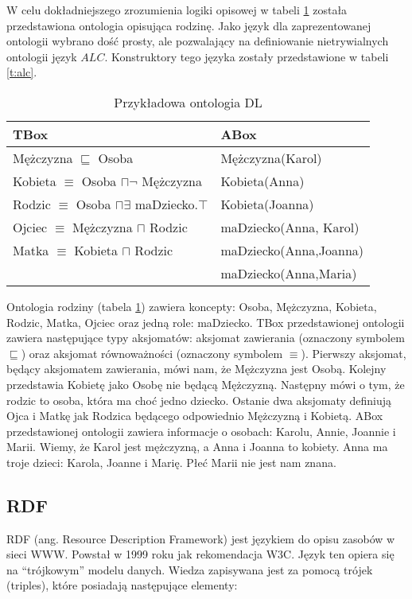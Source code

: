 W celu dokładniejszego zrozumienia logiki opisowej w tabeli \ref{t:ontology}  została przedstawiona ontologia opisująca rodzinę. Jako język dla zaprezentowanej ontologii wybrano 
dość prosty, ale pozwalający na definiowanie nietrywialnych ontologii język   $ ALC $. Konstruktory tego języka zostały przedstawione w tabeli \ref{t:alc}.

\begin{longtable}{|m{7cm}|m{5cm}|} 
\caption{Przykładowa ontologia DL \cite{goczyla2}}
\label{t:ontology} \\
\hline
\bf{TBox} &  \bf{ABox}  \\ \hline
Mężczyzna $ \sqsubseteq $ Osoba & Mężczyzna(Karol) \\ 
Kobieta $ \equiv $ Osoba $\sqcap \neg$ Mężczyzna & Kobieta(Anna) \\ 
Rodzic $\equiv$ Osoba $\sqcap \exists$ maDziecko.$\top$ & Kobieta(Joanna) \\ 
Ojciec $\equiv$ Mężczyzna $\sqcap$ Rodzic & maDziecko(Anna, Karol)  \\ 
Matka $\equiv$ Kobieta $\sqcap$ Rodzic  & maDziecko(Anna,Joanna)   \\ 
& maDziecko(Anna,Maria) \\ \hline
\end{longtable}   

Ontologia rodziny (tabela \ref{t:ontology}) zawiera koncepty: Osoba, Mężczyzna, Kobieta, Rodzic, Matka, Ojciec oraz jedną role: maDziecko. TBox przedstawionej ontologii zawiera
następujące typy aksjomatów: aksjomat zawierania (oznaczony symbolem $ \sqsubseteq$) oraz aksjomat równoważności (oznaczony symbolem $\equiv$). Pierwszy aksjomat, będący
aksjomatem zawierania, mówi nam, że Mężczyzna jest Osobą. Kolejny przedstawia Kobietę jako Osobę nie będącą Mężczyzną. Następny mówi o tym, że rodzic to osoba, która ma choć jedno
dziecko. Ostanie dwa aksjomaty definiują Ojca i Matkę jak Rodzica będącego odpowiednio Mężczyzną i Kobietą. 
ABox przedstawionej ontologii zawiera informacje o osobach: Karolu, Annie, Joannie i Marii. Wiemy, że Karol jest mężczyzną, a Anna i Joanna to kobiety. Anna ma troje dzieci:
Karola, Joanne i Marię. Płeć Marii nie jest nam znana. 


\subsection*{RDF}
RDF (ang. Resource Description Framework) jest językiem do opisu zasobów w sieci WWW. Powstał w 1999 roku jak rekomendacja W3C.
Język ten opiera się na ``trójkowym'' modelu danych. Wiedza zapisywana jest za pomocą trójek (triples), które posiadają następujące elementy:


